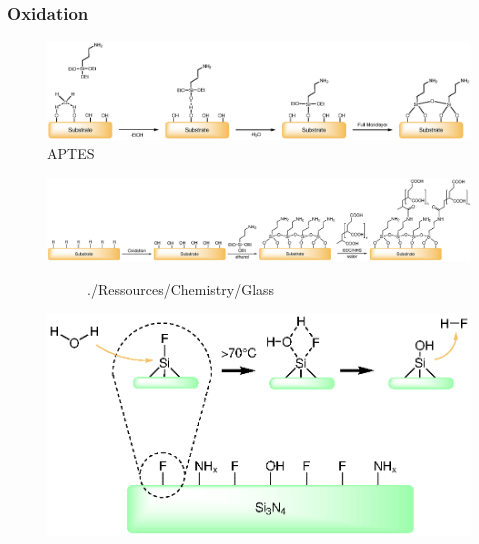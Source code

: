 \subsubsection{Oxidation}

\begin{figure}[htb!]
	\centering
	\includegraphics[width=1\linewidth]{./Ressources/Chemistry/APTES.eps}
	\caption{APTES}
	\label{fig:chem:APTES}
\end{figure}
\begin{figure}[htb!]
	\centering
	\includegraphics[width=1\linewidth]{Ressources/Chemistry/Substrate}
	\caption{}
	\label{fig:chem:func:substrate}
\end{figure}


\begin{figure}[htb!]
	\begin{subfigure}[b]{0.30\textwidth}
	\centering
	\addtocounter{subfigure}{1}  
	 {./Ressources/Chemistry/Glass}		
	\addtocounter{subfigure}{-1}  
	\label{fig:chem:func:glass}
\end{subfigure}%
\hfill
\begin{subfigure}[b]{0.69\textwidth}
	\centering
	\addtocounter{subfigure}{1}  
	\addtocounter{subfigure}{-1}  
	\label{fig:chem:func:pdms}
\end{subfigure}
\end{figure}
\lipsum[2]
\begin{figure}
	\centering
	\includegraphics[width=1\linewidth]{Ressources/Chemistry/SiN}
	\label{fig:chem:func:sin}
\end{figure}
\lipsum[2]

